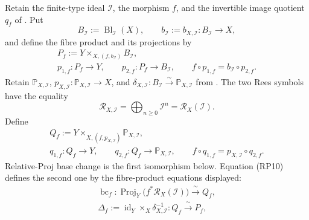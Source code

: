 \begin{definition}
  \label{def:nagata-blowup-universal-lift}

  Retain the finite-type ideal $\mathcal I$, the morphism $f$, and the
  invertible image quotient $q_f$ of
  .  Put
  \[
    B_{\mathcal I}:=\operatorname{Bl}_{\mathcal I}(X),\qquad
    b_{\mathcal I}:=b_{X,\mathcal I}\colon B_{\mathcal I}\to X,
  \]
  and define the fibre product and its projections by
  \[
  \begin{gathered}
    P_f:=Y\times_{X,(f,b_{\mathcal I})}B_{\mathcal I},\\
    p_{1,f}\colon P_f\to Y,\qquad
    p_{2,f}\colon P_f\to B_{\mathcal I},\qquad
    f\circ p_{1,f}=b_{\mathcal I}\circ p_{2,f}.
  \end{gathered}
  \tag{UL0}
  \]
  Retain $\mathbb P_{X,\mathcal I}$,
  $p_{X,\mathcal I}\colon\mathbb P_{X,\mathcal I}\to X$, and
  $\delta_{X,\mathcal I}\colon B_{\mathcal I}\xrightarrow{\sim}
  \mathbb P_{X,\mathcal I}$ from
  .  The two Rees
  symbols have the equality
  \[
    \mathscr R_{X,\mathcal I}
      =\bigoplus_{n\ge0}\mathcal I^n
      =\mathcal R_X(\mathcal I).                              \tag{UL0a}
  \]
  Define
  \[
  \begin{gathered}
    Q_f:=Y\times_{X,(f,p_{X,\mathcal I})}\mathbb P_{X,\mathcal I},\\
    q_{1,f}\colon Q_f\to Y,\qquad
    q_{2,f}\colon Q_f\to\mathbb P_{X,\mathcal I},\qquad
    f\circ q_{1,f}=p_{X,\mathcal I}\circ q_{2,f}.
  \end{gathered}                                               \tag{UL0b}
  \]
  Relative-Proj base change
  \cite[\href{https://stacks.math.columbia.edu/tag/01O3}{Tag 01O3}]
  {stacks-project} is the first isomorphism below.  Equation (RP10) defines
  the second one by the fibre-product equations displayed:
  \[
  \begin{gathered}
    \operatorname{bc}_f\colon
      \operatorname{Proj}_Y\!\bigl(f^*\mathcal R_X(\mathcal I)\bigr)
      \xrightarrow{\ \sim\ }Q_f,\\
    \Delta_f:=
      \operatorname{id}_Y\times_X\delta_{X,\mathcal I}^{-1}
      \colon Q_f\xrightarrow{\ \sim\ }P_f,\\

\end{gathered}\]
\end{definition}
